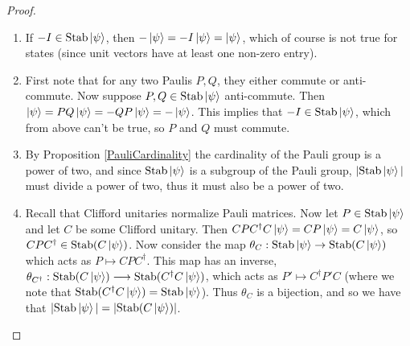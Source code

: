 \documentclass[12pt]{dalthesis}
\begin{document}
\begin{proof}
\hspace{20mm}
\begin{enumerate}
\item If $-I \in \text{Stab}\ket{\psi}$, then $-\ket{\psi} =-I\ket{\psi} = \ket{\psi}$, which of course is not true for states (since unit vectors have at least one non-zero entry).

\item First note that for any two Paulis $P, Q$, they either commute or anti-commute. Now suppose $P, Q \in \text{Stab}\ket{\psi}$ anti-commute. Then $\ket{\psi} = PQ\ket{\psi} = -QP\ket{\psi} = -\ket{\psi}$. This implies that $-I \in \text{Stab}\ket{\psi}$, which from above can't be true, so $P$ and $Q$ must commute.

\item By Proposition \ref{PauliCardinality} the cardinality of the Pauli group is a power of two, and since $\text{Stab}\ket{\psi}$ is a subgroup of the Pauli group, $|\text{Stab}\ket{\psi}|$ must divide a power of two, thus it must also be a power of two.

\item Recall that Clifford unitaries normalize Pauli matrices. Now let $P \in \text{Stab}\ket{\psi}$ and let $C$ be some Clifford unitary. Then $CPC^{\dag}C\ket{\psi} = CP\ket{\psi} = C\ket{\psi}$, so $CPC^{\dag} \in \text{Stab}(C\ket{\psi})$. Now consider the map $\theta_C : \text{Stab}\ket{\psi} \rightarrow \text{Stab}(C\ket{\psi})$ which acts as $P \mapsto CPC^{\dag}$. This map has an inverse, $\theta_{C^\dag}: \text{Stab}(C\ket{\psi}) \longrightarrow \text{Stab}(C^{\dag}C\ket{\psi})$, which acts as $P' \mapsto C^{\dag}P'C$ (where we note that $\text{Stab}(C^{\dag}C\ket{\psi}) = \text{Stab}\ket{\psi}$). Thus $\theta_C$ is a bijection, and so we have that $|\text{Stab}\ket{\psi}| = |\text{Stab}(C\ket{\psi})|$.


\end{enumerate}
\end{proof}
\end{document}
